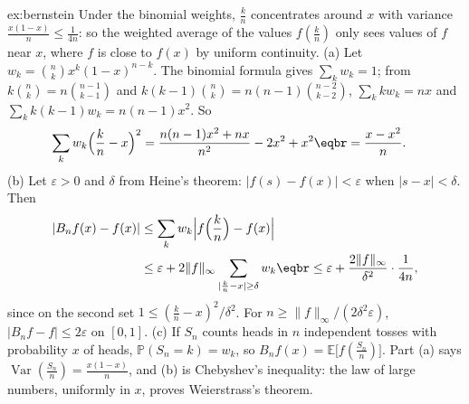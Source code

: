 \begin{solution}{ex:bernstein}
\idea Under the binomial weights, $\frac kn$ concentrates around $x$ with variance $\frac{x(1-x)}n\le\frac1{4n}$: so the weighted average of the values $f(\frac kn)$ only sees values of $f$ near
$x$, where $f$ is close to $f(x)$ by uniform continuity.
\writeup (a) Let $w_k=\binom nkx^k(1-x)^{n-k}$. The binomial formula gives $\sum_kw_k=1$; from $k\binom nk=n\binom{n-1}{k-1}$ and $k(k-1)\binom nk=n(n-1)\binom{n-2}{k-2}$, $\sum_kkw_k=nx$ and
$\sum_kk(k-1)w_k=n(n-1)x^2$. So
\[\begin{aligned}\sum_kw_k\Bigl(\frac kn-x\Bigr)^2&=\frac{n(n-1)x^2+nx}{n^2}-2x^2+x^2\eqbr=\frac{x-x^2}n.\end{aligned}\]
(b) Let $\varepsilon>0$ and $\delta$ from Heine's theorem: $|f(s)-f(x)|<\varepsilon$ when $|s-x|<\delta$. Then
\[\begin{aligned}|B_nf(x)-f(x)|&\le\sum_kw_k\Bigl|f\Bigl(\frac kn\Bigr)-f(x)\Bigr|\\&\le\varepsilon+2\|f\|_\infty\sum_{|\frac kn-x|\ge\delta}w_k\eqbr\le\varepsilon+\frac{2\|f\|_\infty}{\delta^2}\cdot\frac1{4n},\end{aligned}\]
since on the second set $1\le(\frac kn-x)^2/\delta^2$. For $n\ge\|f\|_\infty/(2\delta^2\varepsilon)$, $|B_nf-f|\le2\varepsilon$ on $[0,1]$.
(c) If $S_n$ counts heads in $n$ independent tosses with probability $x$ of heads, $\mathbb P(S_n=k)=w_k$, so $B_nf(x)=\mathbb E\bigl[f(\frac{S_n}n)\bigr]$. Part (a) says $\operatorname{Var}(\frac{S_n}n)=\frac{x(1-x)}n$, and (b) is
Chebyshev's inequality: the law of large numbers, uniformly in $x$, proves Weierstrass's theorem.
\end{solution}


